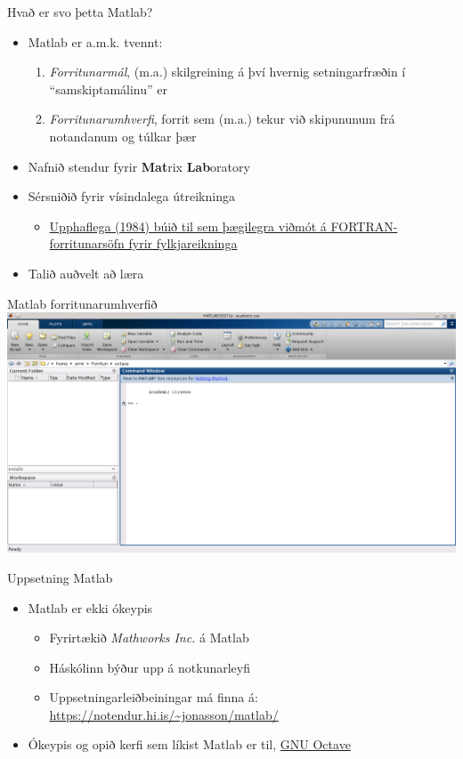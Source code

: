 \documentclass[handout]{beamer}
\begin{document}
\begin{frame}{Hvað er svo þetta Matlab?}
\begin{itemize}
 \item Matlab er a.m.k. tvennt:
 \begin{enumerate}
  \item \emph{Forritunarmál}, (m.a.) skilgreining á því hvernig setningarfræðin í ``samskiptamálinu'' er
  \item \emph{Forritunarumhverfi}, forrit sem (m.a.) tekur við skipununum frá notandanum og túlkar þær
 \end{enumerate}
 \item Nafnið stendur fyrir \textbf{Mat}rix \textbf{Lab}oratory
 \item Sérsniðið fyrir vísindalega útreikninga
 \begin{itemize}
  \item \href{http://se.mathworks.com/company/newsletters/articles/the-origins-of-matlab.html}{Upphaflega (1984) búið til sem þægilegra viðmót á FORTRAN-forritunarsöfn fyrir fylkjareikninga}
 \end{itemize}
 \item Talið auðvelt að læra
\end{itemize}
\end{frame}

\begin{frame}{Matlab forritunarumhverfið}
\includegraphics[width=\linewidth]{Pics/matlab-gui}
\end{frame}

\begin{frame}{Uppsetning Matlab}
\begin{itemize}
 \item Matlab er ekki ókeypis
 \begin{itemize}
  \item Fyrirtækið \emph{Mathworks Inc.} á Matlab
  \item Háskólinn býður upp á notkunarleyfi
  \item Uppsetningarleiðbeiningar má finna á: \url{https://notendur.hi.is/\~jonasson/matlab/}
 \end{itemize}
 \item Ókeypis og opið kerfi sem líkist Matlab er til, \href{https://www.gnu.org/software/octave/}{GNU Octave}
\end{itemize}
\end{frame}
\end{document}
